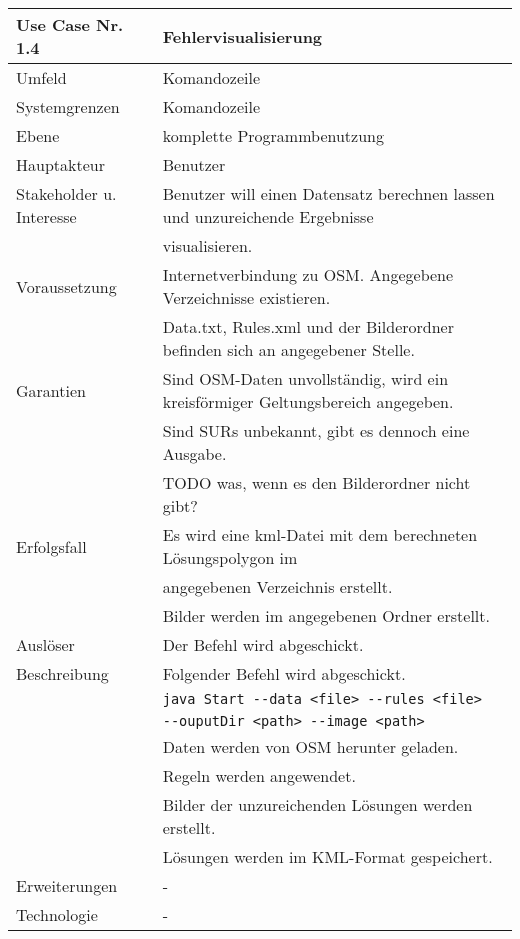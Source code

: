\begin{tabular}{| l | l |}
 \hline
 \textbf{Use Case Nr. 1.4} & Fehlervisualisierung\\
 \hline
 Umfeld & Komandozeile\\
 \hline
 Systemgrenzen & Komandozeile\\
 \hline
 Ebene & komplette Programmbenutzung\\
 \hline
 Hauptakteur & Benutzer\\
 \hline
 Stakeholder u. Interesse & Benutzer will einen Datensatz berechnen lassen und unzureichende Ergebnisse\\
			  & visualisieren.\\
 \hline
 Voraussetzung & Internetverbindung zu OSM. Angegebene Verzeichnisse existieren.\\
	      & Data.txt, Rules.xml und der Bilderordner befinden sich an angegebener Stelle. \\
 \hline
 Garantien & Sind OSM-Daten unvollständig, wird ein kreisförmiger Geltungsbereich angegeben.\\
	  & Sind SURs unbekannt, gibt es dennoch eine Ausgabe.\\
	  & TODO was, wenn es den Bilderordner nicht gibt?\\
 \hline
 Erfolgsfall & Es wird eine kml-Datei mit dem berechneten Lösungspolygon im\\
	    & angegebenen Verzeichnis erstellt.\\
	    & Bilder werden im angegebenen Ordner erstellt.\\
 \hline
 Auslöser & Der Befehl wird abgeschickt.\\
 \hline
 Beschreibung & Folgender Befehl wird abgeschickt.\\
	    & \verb|java Start --data <file> --rules <file>|\\
	    & \hspace{24pt} \verb|--ouputDir <path> --image <path>|\\
	    & Daten werden von OSM herunter geladen.\\
	    & Regeln werden angewendet.\\
	    & Bilder der unzureichenden Lösungen werden erstellt.\\
	    & Lösungen werden im KML-Format gespeichert.\\
 \hline
 Erweiterungen & -\\
 \hline
 Technologie & -\\
 \hline
\end{tabular}




